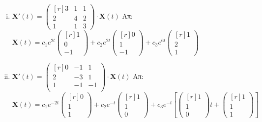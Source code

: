 \begin{enumerate}
\begin{enumerate}[i)]
			\item $ \mathbf{X}'(t) = 
				\begin{pmatrix*}[r]
					3 & 1 & 1 \\
					2 & 4 & 2 \\
					1 & 1 & 3
				\end{pmatrix*} \cdot 
				\mathbf{X}(t)$
				\hfill Απ: {\scriptsize $ \mathbf{X}(t)=c_{1}e^{2t} 
					\begin{pmatrix*}[r] 1 \\ 0 \\ -1 \end{pmatrix*} + c_{2}e^{2t} 
					\begin{pmatrix*}[r] 0 \\ 1 \\ -1 \end{pmatrix*} + c_{3}e^{6t} 
				\begin{pmatrix*}[r] 1 \\ 2 \\ 1 \end{pmatrix*}$ }

			\item $ \mathbf{X}'(t) = 
				\begin{pmatrix*}[r]
					0 & -1 & 1 \\
					2 & -3 & 1 \\
					1 & -1 & -1 \\
				\end{pmatrix*} \cdot 
				\mathbf{X}(t) $
				\hfill Απ: {\scriptsize $ \mathbf{X}(t) =  c_{1}e^{-2t} 
					\begin{pmatrix*}[r] 0 \\ 1 \\ 1 \end{pmatrix*} + c_{2}e^{-t} 
					\begin{pmatrix*}[r] 1 \\ 1 \\ 0  \end{pmatrix*} + c_{3} e^{-t} \left[ 
						\begin{pmatrix*}[r] 1 \\ 1 \\ 0 \end{pmatrix*}t +  
				\begin{pmatrix*}[r] 1 \\ 1 \\ 1 \end{pmatrix*}\right] $}


\end{enumerate}
\end{enumerate}
